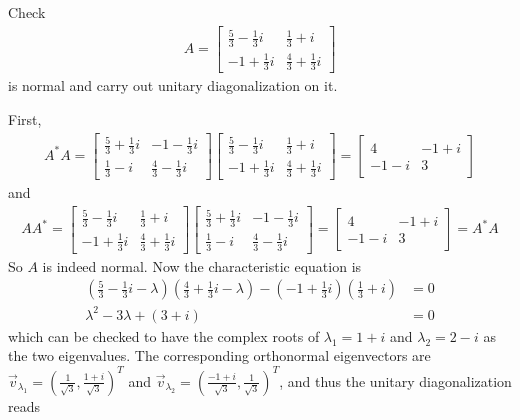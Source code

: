 \begin{exmp}
\label{exmp:unitarydiagnormal}
Check
\begin{align*}
A = 
\begin{bmatrix}
\frac{5}{3}-\frac{1}{3}i &\frac{1}{3}+i \\ 
-1+\frac{1}{3}i & \frac{4}{3}+\frac{1}{3}i
\end{bmatrix}
\end{align*}
is normal and carry out unitary diagonalization on it.
\end{exmp}
\begin{solution}
First,
\begin{align*}
A^* A=
\begin{bmatrix}
\frac{5}{3}+\frac{1}{3}i & -1-\frac{1}{3}i\\ 
\frac{1}{3}-i & \frac{4}{3}-\frac{1}{3}i
\end{bmatrix}
\begin{bmatrix}
\frac{5}{3}-\frac{1}{3}i &\frac{1}{3}+i \\ 
-1+\frac{1}{3}i & \frac{4}{3}+\frac{1}{3}i
\end{bmatrix} =
\begin{bmatrix}
4 & -1+i \\
-1-i & 3
\end{bmatrix}
\end{align*}
and
\begin{align*}
A A^* =
\begin{bmatrix}
\frac{5}{3}-\frac{1}{3}i & \frac{1}{3}+i \\ 
-1+\frac{1}{3}i & \frac{4}{3}+\frac{1}{3}i
\end{bmatrix}
\begin{bmatrix}
\frac{5}{3}+\frac{1}{3}i & -1-\frac{1}{3}i \\ 
\frac{1}{3}-i & \frac{4}{3}-\frac{1}{3}i
\end{bmatrix} =
\begin{bmatrix}
4 & -1+i \\
-1-i & 3
\end{bmatrix} = A^* A
\end{align*}
So $A$ is indeed normal. Now the characteristic equation is
\begin{align*}
(\frac{5}{3}-\frac{1}{3}i-\lambda)(\frac{4}{3}+\frac{1}{3}i-\lambda) - (-1+\frac{1}{3}i)(\frac{1}{3}+i) &= 0 \\
\lambda^2 - 3\lambda + (3+i) &= 0 
\end{align*}
which can be checked to have the complex roots of $\lambda_1 = 1+i$ and $\lambda_2 = 2-i$ as the two eigenvalues. The corresponding orthonormal eigenvectors are $\vec{v}_{\lambda_1} = (\frac{1}{\sqrt{3}}, \frac{1+i}{\sqrt{3}})^T$ and $\vec{v}_{\lambda_2} = (\frac{-1+i}{\sqrt{3}}, \frac{1}{\sqrt{3}})^T$, and thus the unitary diagonalization reads

\end{solution}
